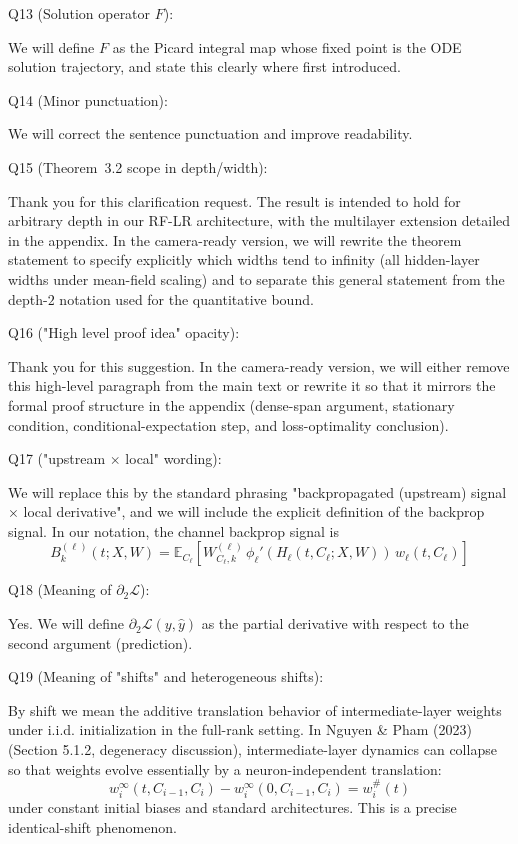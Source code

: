 Q13 (Solution operator $F$):

We will define $F$ as the Picard integral map whose fixed point is the ODE solution trajectory, and state this clearly where first introduced.

Q14 (Minor punctuation):

We will correct the sentence punctuation and improve readability.

Q15 (Theorem~3.2 scope in depth/width):

Thank you for this clarification request. The result is intended to hold for arbitrary depth in our RF-LR architecture, with the multilayer extension detailed in the appendix. In the camera-ready version, we will rewrite the theorem statement to specify explicitly which widths tend to infinity (all hidden-layer widths under mean-field scaling) and to separate this general statement from the depth-$2$ notation used for the quantitative bound.

Q16 ("High level proof idea" opacity):

Thank you for this suggestion. In the camera-ready version, we will either remove this high-level paragraph from the main text or rewrite it so that it mirrors the formal proof structure in the appendix (dense-span argument, stationary condition, conditional-expectation step, and loss-optimality conclusion).

Q17 ("upstream $\times$ local" wording):

We will replace this by the standard phrasing "backpropagated (upstream) signal $\times$ local derivative", and we will include the explicit definition of the backprop signal. In our notation, the channel backprop signal is
$$
B_k^{(\ell)}(t;X,W)=\mathbb E_{C_\ell}\left[W_{C_\ell,k}^{(\ell)}\,\phi_\ell'(H_\ell(t,C_\ell;X,W))\,w_\ell(t,C_\ell)\right]
$$

Q18 (Meaning of $\partial_2 \mathcal{L}$):

Yes. We will define $\partial_2\mathcal L(y,\hat y)$ as the partial derivative with respect to the second argument (prediction).

Q19 (Meaning of "shifts" and heterogeneous shifts):

By shift we mean the additive translation behavior of intermediate-layer weights under i.i.d. initialization in the full-rank setting. In Nguyen \& Pham (2023) (Section 5.1.2, degeneracy discussion), intermediate-layer dynamics can collapse so that weights evolve essentially by a neuron-independent translation:
$$
w_i^\infty(t,C_{i-1},C_i)-w_i^\infty(0,C_{i-1},C_i)=w_i^\#(t)
$$
under constant initial biases and standard architectures. This is a precise identical-shift phenomenon.

